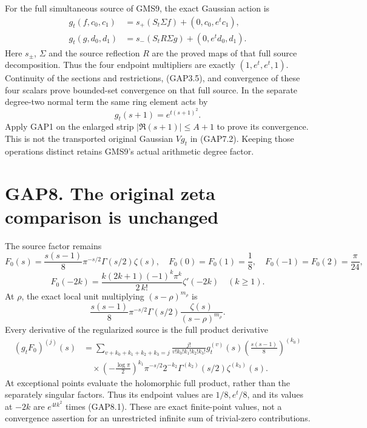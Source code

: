 For the full simultaneous source of GMS9, the exact Gaussian action is
\[
\begin{aligned}
g_t(f,c_0,c_1)&=s_+(S_t\Sigma f)+(0,c_0,e^tc_1),\\
g_t(g,d_0,d_1)&=s_-(S_tR\Sigma g)+(0,e^td_0,d_1).
\end{aligned}
\tag{GAP7.4}
\] Here \(s_\pm\), \(\Sigma\) and the source reflection \(R\) are the
proved maps of that full source decomposition. Thus the four endpoint
multipliers are exactly \((1,e^t,e^t,1)\). Continuity of the sections
and restrictions, (GAP3.5), and convergence of these four scalars prove
bounded-set convergence on that full source. In the separate degree-two
normal term the same ring element acts by \[
g_t(s+1)=e^{t(s+1)^2}.
\tag{GAP7.5}
\] Apply GAP1 on the enlarged strip \(|\Re(s+1)|\le A+1\) to prove its
convergence. This is not the transported original Gaussian \(Vg_t\) in
(GAP7.2). Keeping those operations distinct retains GMS9's actual
arithmetic degree factor.

\section{GAP8. The original zeta comparison is
unchanged}\label{gap8.-the-original-zeta-comparison-is-unchanged}

The source factor remains \[
F_0(s)=\frac{s(s-1)}8\pi^{-s/2}\Gamma(s/2)\zeta(s),
\quad F_0(0)=F_0(1)=\frac18,\quad
F_0(-1)=F_0(2)=\frac\pi{24},
\] \[
F_0(-2k)=\frac{k(2k+1)(-1)^k\pi^k}{2\,k!}\zeta'(-2k)
\quad(k\ge1).
\tag{GAP8.1}
\] At \(\rho\), the exact local unit multiplying \((s-\rho)^{m_\rho}\)
is \[
\frac{s(s-1)}8\pi^{-s/2}\Gamma(s/2)
\frac{\zeta(s)}{(s-\rho)^{m_\rho}}.
\tag{GAP8.2}
\] Every derivative of the regularized source is the full product
derivative \[
\begin{aligned}
(g_tF_0)^{(j)}(s)&=\sum_{v+k_0+k_1+k_2+k_3=j}
\frac{j!}{v!k_0!k_1!k_2!k_3!}g_t^{(v)}(s)
\left(\frac{s(s-1)}8\right)^{(k_0)}
\\&\quad{}\times \left(-\frac{\log\pi}2\right)^{k_1}\pi^{-s/2}
2^{-k_2}\Gamma^{(k_2)}(s/2)\zeta^{(k_3)}(s).
\end{aligned}
\tag{GAP8.3}
\] At exceptional points evaluate the holomorphic full product, rather
than the separately singular factors. Thus its endpoint values are
\(1/8,e^t/8\), and its values at \(-2k\) are \(e^{4tk^2}\) times
(GAP8.1). These are exact finite-point values, not a convergence
assertion for an unrestricted infinite sum of trivial-zero
contributions.

